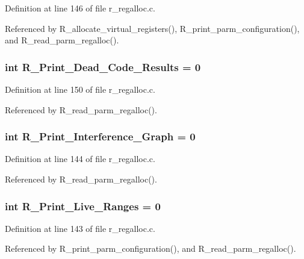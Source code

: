 Definition at line 146 of file r\_\-regalloc.c.

Referenced by R\_\-allocate\_\-virtual\_\-registers(), R\_\-print\_\-parm\_\-configuration(), and R\_\-read\_\-parm\_\-regalloc().
\subsubsection{\setlength{\rightskip}{0pt plus 5cm}int \bf{R\_\-Print\_\-Dead\_\-Code\_\-Results} = 0}\label{r__regalloc_8c_fe6f57697cef035ba961e2fb7ceb30ab}




Definition at line 150 of file r\_\-regalloc.c.

Referenced by R\_\-read\_\-parm\_\-regalloc().
\subsubsection{\setlength{\rightskip}{0pt plus 5cm}int \bf{R\_\-Print\_\-Interference\_\-Graph} = 0}\label{r__regalloc_8c_12d24fb1e1bffd01fdebc9d826413a1c}




Definition at line 144 of file r\_\-regalloc.c.

Referenced by R\_\-read\_\-parm\_\-regalloc().
\subsubsection{\setlength{\rightskip}{0pt plus 5cm}int \bf{R\_\-Print\_\-Live\_\-Ranges} = 0}\label{r__regalloc_8c_cf839178054c7970cc5e36af35907fba}




Definition at line 143 of file r\_\-regalloc.c.

Referenced by R\_\-print\_\-parm\_\-configuration(), and R\_\-read\_\-parm\_\-regalloc().
